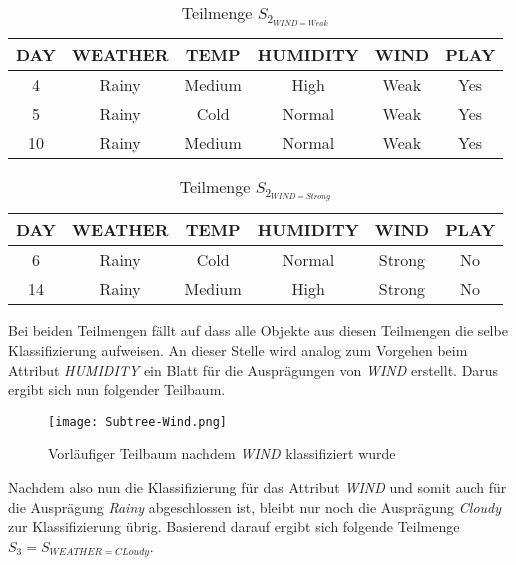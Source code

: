 \begin{table}[H]
    \centering
    \begin{tabular}{cccccc}
        \toprule
        \textbf{DAY} & \textbf{WEATHER} & \textbf{TEMP} & \textbf{HUMIDITY} & \textbf{WIND} & \textbf{PLAY} \\
        \toprule
        4   &Rainy	&Medium	&High	&Weak	&Yes \\
        5   &Rainy	&Cold	&Normal	&Weak	&Yes \\
        10  &Rainy	&Medium	&Normal	&Weak	&Yes \\
        \bottomrule
    \end{tabular}
    \caption{Teilmenge $S_{2_{WIND=Weak}}$}
    \label{table:datensatz-wind-weak}
\end{table}

\begin{table}[H]
    \centering
    \begin{tabular}{cccccc}
        \toprule
        \textbf{DAY} & \textbf{WEATHER} & \textbf{TEMP} & \textbf{HUMIDITY} & \textbf{WIND} & \textbf{PLAY} \\
        \toprule
        6   &Rainy	&Cold	&Normal	&Strong	&No  \\
        14  &Rainy	&Medium	&High	&Strong	&No  \\
        \bottomrule
    \end{tabular}
    \caption{Teilmenge $S_{2_{WIND=Strong}}$}
    \label{table:datensatz-wind-strong}
\end{table}

Bei beiden Teilmengen fällt auf dass alle Objekte aus diesen Teilmengen die selbe Klassifizierung aufweisen. An dieser Stelle wird analog zum Vorgehen beim Attribut \textit{HUMIDITY} ein Blatt für die Ausprägungen von \textit{WIND} erstellt. Darus ergibt sich nun folgender Teilbaum.

\begin{figure}[htbp]
    \centering
    \texttt{[image: Subtree-Wind.png]}
    \caption{Vorläufiger Teilbaum nachdem \textit{WIND} klassifiziert wurde}
\end{figure}

Nachdem also nun die Klassifizierung für das Attribut \textit{WIND} und somit auch für die Ausprägung \textit{Rainy} abgeschlossen ist, bleibt nur noch die Ausprägung \textit{Cloudy} zur Klassifizierung übrig. Basierend darauf ergibt sich folgende Teilmenge $S_{3} = S_{WEATHER=CLoudy}$.

